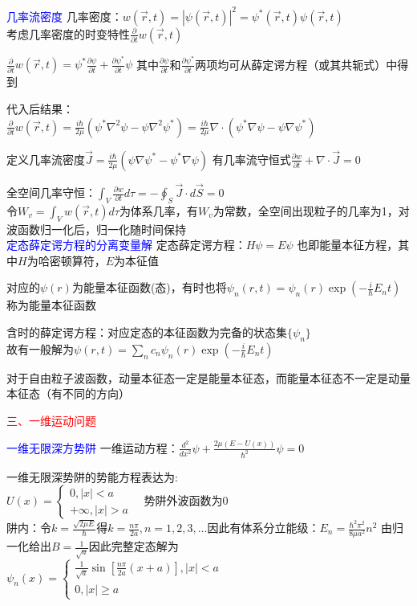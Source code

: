 \documentclass[a4paper,8pt]{extarticle} %
\newcommand{\bluetext}[1]{\textcolor{blue}{#1}}
\newcommand{\redtext}[1]{\textcolor{red}{#1}}
\begin{document}
\begin{multicols}{3}
\bluetext{几率流密度}
几率密度：$w(\vec{r}, t) = |\psi(\vec{r}, t)|^2 = \psi^*(\vec{r}, t)\psi(\vec{r}, t)$ \\ 考虑几率密度的时变特性$\frac{\partial}{\partial t}w(\vec{r}, t)$
    
    $\frac{\partial}{\partial t}w(\vec{r}, t) = \psi^*\frac{\partial\psi}{\partial t} + \frac{\partial\psi^*}{\partial t}\psi$ 其中$\frac{\partial\psi}{\partial t}$和$\frac{\partial\psi^*}{\partial t}$两项均可从薛定谔方程（或其共轭式）中得到
    
    代入后结果：\\ $\frac{\partial}{\partial t}w(\vec{r}, t) = \frac{i\hbar}{2\mu}(\psi^*\nabla^2\psi - \psi\nabla^2\psi^*) = \frac{i\hbar}{2\mu}\nabla\cdot(\psi^*\nabla\psi - \psi\nabla\psi^*)$
    
    定义几率流密度$\vec{J} = \frac{i\hbar}{2\mu}(\psi\nabla\psi^* - \psi^*\nabla\psi)$ 有几率流守恒式$\frac{\partial w}{\partial t} + \nabla\cdot\vec{J} = 0$

    全空间几率守恒：$\int_V \frac{\partial w}{\partial t}d\tau = - \oint_S \vec{J}\cdot d\vec{S} = 0$\\

    令$W_v=\int_V w(\vec{r}, t)d\tau$为体系几率，有$W_v$为常数，全空间出现粒子的几率为1，对波函数归一化后，归一化随时间保持\\
\bluetext{定态薛定谔方程的分离变量解}
定态薛定谔方程：$H\psi = E\psi$ 也即能量本征方程，其中$H$为哈密顿算符，$E$为本征值

对应的$\psi(r)$为能量本征函数(态)，有时也将$\psi_n(r, t) = \psi_n(r)\exp(-\frac{i}{\hbar}E_n t)$称为能量本征函数

含时的薛定谔方程：对应定态的本征函数为完备的状态集$\{\psi_n\}$\\
故有一般解为$\psi(r, t) = \sum_n c_n\psi_n(r)\exp(-\frac{i}{\hbar}E_n t)$

对于自由粒子波函数，动量本征态一定是能量本征态，而能量本征态不一定是动量本征态（有不同的方向）

\redtext{三、一维运动问题}

\bluetext{一维无限深方势阱}
一维运动方程：$\frac{d^2}{dx^2}\psi + \frac{2\mu(E-U(x))}{\hbar^2}\psi = 0$

一维无限深势阱的势能方程表达为: \\
$ U(x) = \begin{cases} 
0, |x| < a \\
+\infty, |x| > a
\end{cases} \quad \text{势阱外波函数为0} $\\
阱内：令$k = \frac{\sqrt{2\mu E}}{\hbar}$得$k = \frac{n\pi}{2a}, n=1,2,3,\dots$因此有体系分立能级：$E_n = \frac{\hbar^2\pi^2}{8\mu a^2}n^2$
由归一化给出$B = \frac{1}{\sqrt{a}}$因此完整定态解为 \\
$ \psi_n(x) = \begin{cases}
\frac{1}{\sqrt{a}}\sin[\frac{n\pi}{2a}(x + a)], |x| < a \\
0, |x| \geq a
\end{cases} $


\end{multicols}
\end{document}
